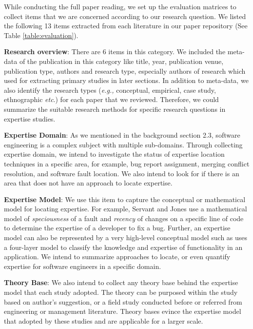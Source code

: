 While conducting the full paper reading, we set up the evaluation matrices to collect items that we are concerned according to our research question. We listed the following 13 items extracted from each literature in our paper repository (See Table \ref{table:evaluation}).

\textbf{Research overview}: There are 6 items in this category. We included the meta-data of the publication in this category like title, year, publication venue, publication type, authors and research type, especially authors of research which used for extracting primary studies in later sections. In addition to meta-data, we also identify the research types (\textit{e.g.,} conceptual, empirical, case study, ethnographic \textit{etc}.) for each paper that we reviewed. Therefore, we could summarize the suitable research methods for specific research questions in expertise studies.

\textbf{Expertise Domain}: As we mentioned in the background section 2.3, software engineering is a complex subject with multiple sub-domains. Through collecting expertise domain, we intend to investigate the status of expertise location techniques in a specific area, for example, bug report assignment, merging conflict resolution, and software fault location. We also intend to look for if there is an area that does not have an approach to locate expertise.

\textbf{Expertise Model}: We use this item to capture the conceptual or mathematical model for locating expertise. For example, Servant and Jones \cite{servant2012whosefault} use a mathematical model of \textit{speciousness} of a fault and \textit{recency} of changes on a specific line of code to determine the expertise of a developer to fix a bug. Further, an expertise model can also be represented by a very high-level conceptual model such as \cite{Ye2002Supporting} uses a four-layer model to classify the knowledge and expertise of functionality in an application. We intend to summarize approaches to locate, or even quantify expertise for software engineers in a specific domain.

\textbf{Theory Base}: We also intend to collect any theory base behind the expertise model that each study adopted. The theory can be purposed within the study based on author's suggestion, or a field study conducted before or referred from engineering or management literature. Theory bases evince the expertise model that adopted by these studies and are applicable for a larger scale.

